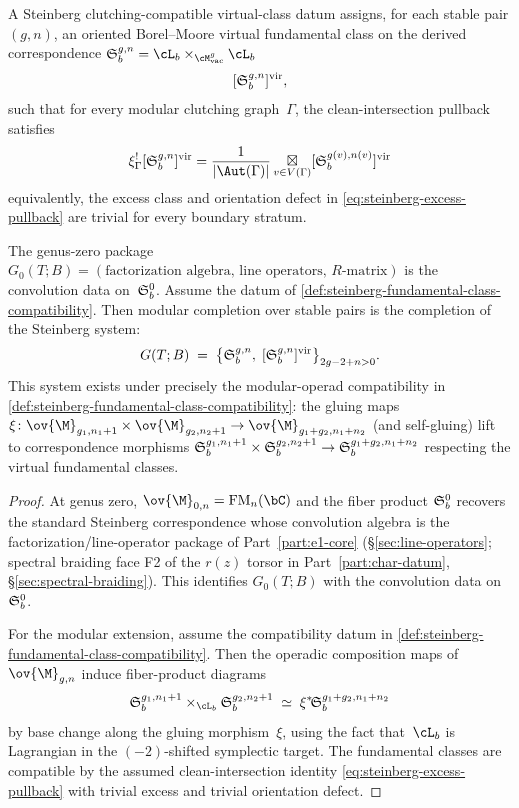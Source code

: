 \begin{definition}
\label{def:steinberg-fundamental-class-compatibility}
A Steinberg clutching-compatible virtual-class datum assigns, for each
stable pair \((g,n)\), an oriented Borel--Moore virtual fundamental
class on the derived correspondence
\(\fS_b^{g,n}=\cL_b\times_{\cM_{\mathrm{vac}}^g}\cL_b\)
\[
[\mathfrak{S}_b^{g,n}]^{\mathrm{vir}},
\]
such that for every modular clutching graph~\(\Gamma\), the
clean-intersection pullback satisfies
\[
 \xi_\Gamma^![\fS_b^{g,n}]^{\mathrm{vir}}
 =
 \frac{1}{|\Aut(\Gamma)|}
 \mathop{\boxtimes}\limits_{v\in V(\Gamma)}
 [\fS_b^{g(v),n(v)}]^{\mathrm{vir}}
\]
equivalently, the excess class and orientation defect in
\eqref{eq:steinberg-excess-pullback} are trivial for every boundary
stratum.
\end{definition}

\begin{proposition}
\label{prop:modular-completion-steinberg}
The genus-zero package
$G_0(T;B) = (\text{factorization algebra, line operators, $R$-matrix})$
is the convolution data on~$\mathfrak{S}_b^{0}$.
Assume the datum of
\autoref{def:steinberg-fundamental-class-compatibility}. Then
modular completion over stable pairs is the completion of the Steinberg system:
\begin{equation}
\label{eq:steinberg-system}
G(T;B)
\;=\;
\bigl\{\mathfrak{S}_b^{g,n},\; [\mathfrak{S}_b^{g,n}]^{\mathrm{vir}}\bigr\}_{2g-2+n>0}.
\end{equation}
This system exists under precisely the modular-operad
compatibility in
\autoref{def:steinberg-fundamental-class-compatibility}: the gluing maps
$\xi\colon \ov{\M}_{g_1,n_1+1} \times \ov{\M}_{g_2,n_2+1}
\to \ov{\M}_{g_1+g_2,n_1+n_2}$ (and self-gluing) lift to
correspondence morphisms
$\mathfrak{S}_b^{g_1,n_1+1} \times \mathfrak{S}_b^{g_2,n_2+1}
\to \mathfrak{S}_b^{g_1+g_2,n_1+n_2}$
respecting the virtual fundamental classes.
\end{proposition}

\begin{proof}
At genus zero, $\ov{\M}_{0,n} = \mathrm{FM}_n(\bC)$ and the
fiber product $\mathfrak{S}_b^{0}$ recovers the standard
Steinberg correspondence whose convolution algebra is the
factorization/line-operator package of Part~\ref{part:e1-core}
(\S\ref*{sec:line-operators}; spectral braiding face F2 of the
$r(z)$ torsor in Part~\ref{part:char-datum},
\S\ref*{sec:spectral-braiding}).
This identifies $G_0(T;B)$ with the convolution data on~$\mathfrak{S}_b^{0}$.

For the modular extension, assume the compatibility datum in
\autoref{def:steinberg-fundamental-class-compatibility}. Then the operadic
composition maps of $\ov{\M}_{g,n}$ induce fiber-product
diagrams
\[
\fS_b^{g_1,n_1+1} \times_{\cL_b} \fS_b^{g_2,n_2+1}
\;\simeq\;
\xi^*\!\fS_b^{g_1+g_2,n_1+n_2}
\]
by base change along the gluing morphism~$\xi$, using the
fact that~$\cL_b$ is Lagrangian in the
$(-2)$-shifted symplectic target.
The fundamental classes are compatible by the assumed
clean-intersection identity
\eqref{eq:steinberg-excess-pullback} with trivial excess and
trivial orientation defect.
\end{proof}

